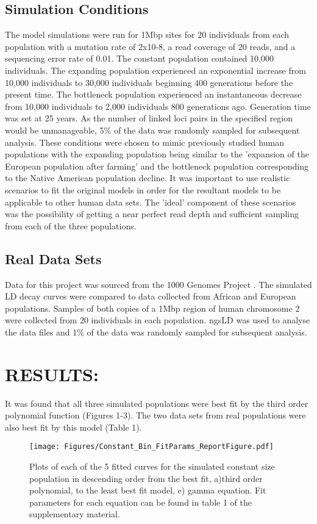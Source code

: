 \documentclass[11pt]{article}
\begin{document}
\begin{linenumbers}
\subsection{Simulation Conditions}
The model simulations were run for 1Mbp sites for 20 individuals from each population with a mutation rate of 2x10-8, a read coverage of 20 reads, and a sequencing error rate of 0.01. The constant population contained 10,000 individuals. The expanding population experienced an exponential increase from 10,000 individuals to 30,000 individuals beginning 400 generations before the present time. The bottleneck population experienced an instantaneous decrease from 10,000 individuals to 2,000 individuals 800 generations ago. Generation time was set at 25 years. As the number of linked loci pairs in the specified region would be unmanageable, 5\% of the data was randomly sampled for subsequent analysis. These conditions were chosen to mimic previously studied human populations with the expanding population being similar to the 'expansion of the European population after farming' and the bottleneck population corresponding to the Native American population decline. It was important to use realistic scenarios to fit the original models in order for the resultant models to be applicable to other human data sets. The 'ideal' component of these scenarios was the possibility of getting a near perfect read depth and sufficient sampling from each of the three populations.

\subsection{Real Data Sets}
Data for this project was sourced from the 1000 Genomes Project \citep{10002015global}. The simulated LD decay curves were compared to data collected from African and European populations. Samples of both copies of a 1Mbp region of human chromosome 2 were collected from 20 individuals in each population. ngsLD {} was used to analyse the data files and 1\% of the data was randomly sampled for subsequent analysis.     

\section{RESULTS:}
It was found that all three simulated populations were best fit by the third order polynomial function (Figures 1-3). The two data sets from real populations were also best fit by this model (Table 1).   

\begin{figure}[htp]
\begin{center}
\texttt{[image: Figures/Constant\_Bin\_FitParams\_ReportFigure.pdf]}
\caption{\small Plots of each of the 5 fitted curves for the simulated constant size population in descending order from the best fit, a)third order polynomial, to the least best fit model, e) gamma equation. Fit parameters for each equation can be found in table 1 of the supplementary material.}
\end{center}
\end{figure}


\end{linenumbers}
\end{document}

